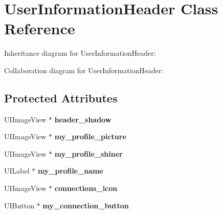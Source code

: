 \hypertarget{interface_user_information_header}{
\section{\-User\-Information\-Header \-Class \-Reference}
\label{interface_user_information_header}
}


\-Inheritance diagram for \-User\-Information\-Header\-:


\-Collaboration diagram for \-User\-Information\-Header\-:
\subsection*{\-Protected \-Attributes}
\begin{DoxyCompactItemize}
\item 
\hypertarget{interface_user_information_header_a2cf0091ce19e40bb12fb6cd38c070f87}{
\-U\-I\-Image\-View $\ast$ {\bfseries header\-\_\-shadow}}
\label{interface_user_information_header_a2cf0091ce19e40bb12fb6cd38c070f87}

\item 
\hypertarget{interface_user_information_header_a168fb503ff1cd4f5c321e3daf835d8c3}{
\-U\-I\-Image\-View $\ast$ {\bfseries my\-\_\-profile\-\_\-picture}}
\label{interface_user_information_header_a168fb503ff1cd4f5c321e3daf835d8c3}

\item 
\hypertarget{interface_user_information_header_a726395246c8ffc25097ed5f2e722edb3}{
\-U\-I\-Image\-View $\ast$ {\bfseries my\-\_\-profile\-\_\-shiner}}
\label{interface_user_information_header_a726395246c8ffc25097ed5f2e722edb3}

\item 
\hypertarget{interface_user_information_header_aa22470a1402ee4cd5b184e85b4580bda}{
\-U\-I\-Label $\ast$ {\bfseries my\-\_\-profile\-\_\-name}}
\label{interface_user_information_header_aa22470a1402ee4cd5b184e85b4580bda}

\item 
\hypertarget{interface_user_information_header_a622ce230c6c5fc425c24b27ecc8d4845}{
\-U\-I\-Image\-View $\ast$ {\bfseries connections\-\_\-icon}}
\label{interface_user_information_header_a622ce230c6c5fc425c24b27ecc8d4845}

\item 
\hypertarget{interface_user_information_header_ad049c01818b8ba349c31798febad1ee0}{
\-U\-I\-Button $\ast$ {\bfseries my\-\_\-connection\-\_\-button}}
\label{interface_user_information_header_ad049c01818b8ba349c31798febad1ee0}


\end{DoxyCompactItemize}

